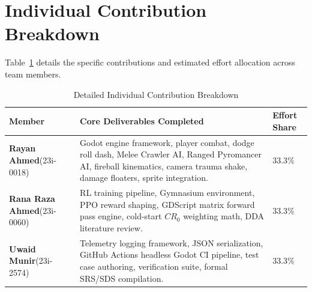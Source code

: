 \section{Individual Contribution Breakdown}
Table~\ref{tab:contribution_breakdown} details the specific contributions and estimated effort allocation across team members.

\begin{table}[!htbp]
\centering
\caption{Detailed Individual Contribution Breakdown}
\label{tab:contribution_breakdown}
\small
\begin{tabular}{p{}p{}p{}}
\toprule
\textbf{Member} & \textbf{Core Deliverables Completed} & \textbf{Effort Share} \\
\midrule
\textbf{Rayan Ahmed}\newline (23i-0018) & Godot engine framework, player combat, dodge roll dash, Melee Crawler AI, Ranged Pyromancer AI, fireball kinematics, camera trauma shake, damage floaters, sprite integration. & $33.3\%$ \\
\midrule
\textbf{Rana Raza Ahmed}\newline (23i-0060) & RL training pipeline, Gymnasium environment, PPO reward shaping, GDScript matrix forward pass engine, cold-start $CR_0$ weighting math, DDA literature review. & $33.3\%$ \\
\midrule
\textbf{Uwaid Munir}\newline (23i-2574) & Telemetry logging framework, JSON serialization, GitHub Actions headless Godot CI pipeline, test case authoring, verification suite, formal SRS/SDS compilation. & $33.3\%$ \\
\bottomrule
\end{tabular}
\end{table}


